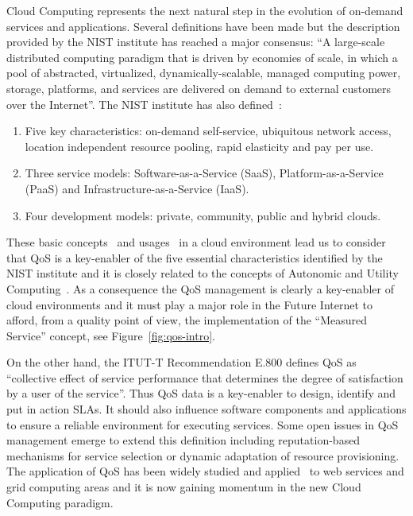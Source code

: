 Cloud Computing represents the next natural step in the evolution of on-demand services and applications. 
Several definitions have been made but the description~\cite{mell2011nist} provided by the NIST institute has reached a major consensus:  
``A large-scale distributed computing paradigm that is driven by economies of scale, in which a pool of 
abstracted, virtualized, dynamically-scalable, managed computing power, storage, platforms, and services are delivered on demand to external customers over the Internet''. 
The NIST institute has also defined~\cite{mell2011nist,Garcia-Sanchez:2010:ASS:1852403.1852409}: 
\begin{enumerate}
 \item Five key characteristics: on-demand self-service, ubiquitous network access, location independent resource pooling, rapid elasticity and pay per use.
 \item Three service models: Software-as-a-Service (SaaS), Platform-as-a-Service (PaaS) and Infrastructure-as-a-Service (IaaS).
 \item Four development models: private, community, public and hybrid clouds. 
\end{enumerate}

These basic concepts~\cite{mell2011nist} and usages~\cite{cloud-usage} in a cloud environment lead us to consider that QoS is a key-enabler of the five essential characteristics identified by 
the NIST institute and it is closely related to the concepts of Autonomic and Utility Computing~\cite{Huebscher:2008:SAC:1380584.1380585}. 
As a consequence the QoS management is clearly a key-enabler of cloud environments and it must play a major role in the Future Internet to 
afford, from a quality point of view, the implementation of the ``Measured Service'' concept, see Figure~\ref{fig:qos-intro}.

On the other hand, the ITUT-T Recommendation E.800 defines QoS as ``collective effect of service performance that determines the degree of 
satisfaction by a user of the service''. Thus QoS data is a key-enabler to design, identify and put in action SLAs. It should also influence 
software components and applications to ensure a reliable environment for executing services. Some open issues in 
QoS management emerge to extend this definition including reputation-based mechanisms for service selection or 
dynamic adaptation of resource provisioning. The application of QoS has been widely studied and 
applied~\cite{Conejero:2012:MSQ:2357487.2357591,Pedersen:2011:AMQ:2114495.2115542} to web services and grid computing areas and it is now 
gaining momentum in the new Cloud Computing paradigm. 

